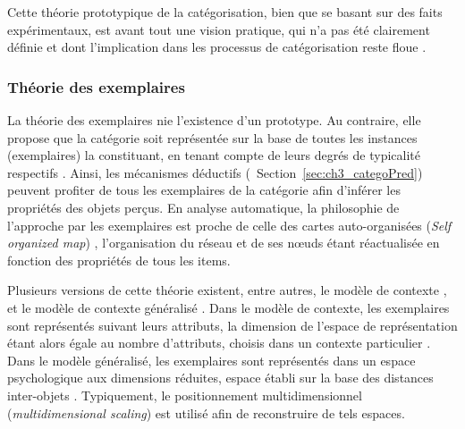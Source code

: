 Cette théorie prototypique de la catégorisation, bien que se basant sur des faits expérimentaux, est avant tout une vision pratique, qui n'a pas été clairement définie et dont l'implication dans les processus de catégorisation reste floue \citep[p. 36-40]{rosch1978cognition} \citep[p. 49-54]{dubois1991semantique}.

\subsubsection{Théorie des exemplaires}

La théorie des exemplaires nie l'existence d'un prototype. Au contraire, elle propose que la catégorie soit représentée sur la base de toutes les instances (exemplaires) la constituant, en tenant compte de leurs degrés de typicalité respectifs \citep{medin1978context,nosofsky1986attention,nosofsky1992similarity}. Ainsi, les mécanismes déductifs (\cf~Section~\ref{sec:ch3_categoPred}) peuvent profiter de tous les exemplaires de la catégorie afin d'inférer les propriétés des objets perçus. En analyse automatique, la philosophie de l'approche par les exemplaires est proche de celle des cartes auto-organisées (\emph{Self organized map}) \citep{kohonen1995som}, l’organisation du réseau et de ses nœuds étant réactualisée en fonction des propriétés de tous les items.

Plusieurs versions de cette théorie existent, entre autres, le modèle de contexte \citep{medin1978context}, et le modèle de contexte généralisé \citep{nosofsky1986attention}. Dans le modèle de contexte, les exemplaires sont représentés suivant leurs attributs, la dimension de l'espace de représentation étant alors égale au nombre d'attributs, choisis dans un contexte particulier \citep{hitzman1986schema}. Dans le modèle généralisé, les exemplaires sont représentés dans un espace psychologique aux dimensions réduites, espace établi sur la base des distances inter-objets \citep{nosofsky1992similarity}. Typiquement, le positionnement multidimensionnel (\emph{multidimensional scaling}) est utilisé afin de reconstruire de tels espaces.


